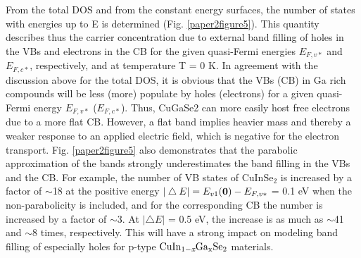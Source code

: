 \documentclass[a4paper, 12pt, titlepage,oneside,drop]{kthesis}
\begin{document}
From the total DOS and from the constant energy surfaces, the number of states with energies up to E is determined (Fig. \ref{paper2figure5}). This quantity describes thus the carrier
concentration due to external band filling of holes in the VBs and electrons in the CB for the given quasi-Fermi energies $E_{F,v*}$ and $E_{F,c*}$, respectively, and at
temperature T = 0 K. In agreement with the discussion above for the total DOS, it is obvious that the VBs (CB) in Ga rich compounds will be less (more) populate
by holes (electrons) for a given quasi-Fermi energy $E_{F,v*}$ ($E_{F,c*}$). Thus, CuGaSe2 can more easily host free electrons due to a more flat CB. However, a flat band 
implies heavier mass and thereby a weaker response to an applied electric field, which is negative for the electron transport.  
Fig. \ref{paper2figure5} also demonstrates that the parabolic approximation of the bands strongly underestimates the band filling in the VBs and the CB. For example, the number of
VB states of $\mathrm {CuInSe_2}$ is increased by a factor of $\sim$18 at the positive energy $|\bigtriangleup E| = E_{v1}(\textbf 0) - E_{F,v*}$ = 0.1 eV when the non-parabolicity is included, and for the
corresponding CB the number is increased by a factor of $\sim$3. At $|\bigtriangleup E|$ = 0.5 eV, the increase is as much as $\sim$41 and $\sim$8 times, respectively. This will have a strong
impact on modeling band filling of especially holes for p-type $\mathrm { CuIn_{1-\textit{x}}Ga_{x}Se_2}$ materials.
\end{document}
